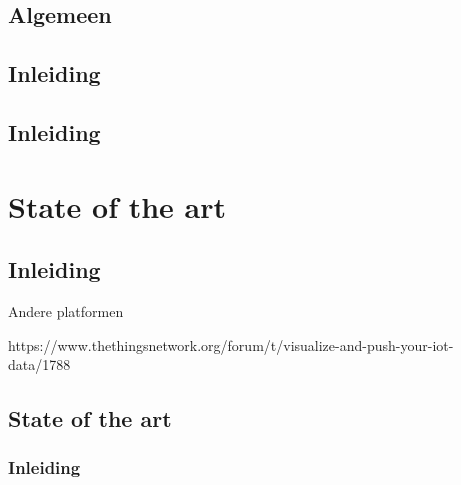 \section{Algemeen}
 
 
 \section{Inleiding}
 
 
 
 \section{Inleiding}

\chapter{State of the art}


\section{Inleiding}

 


Andere platformen

https://www.thethingsnetwork.org/forum/t/visualize-and-push-your-iot-data/1788

\section{State of the art}



\subsection{Inleiding}
 
